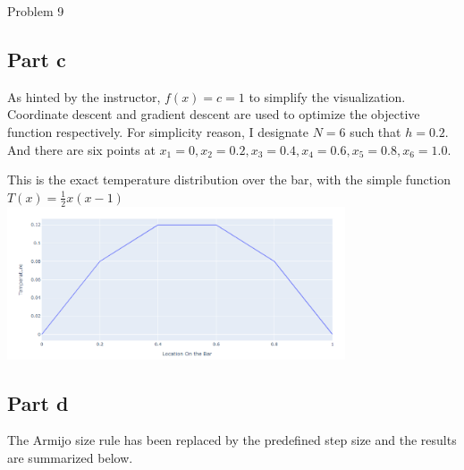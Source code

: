 \documentclass[10pt]{article}
\begin{document}
\begin{section}{Problem 9}
\subsection{Part c}
As hinted by the instructor, $f(x) = c = 1$ to simplify the visualization. Coordinate descent and gradient descent are used to optimize the objective function respectively. For simplicity reason, I designate $N = 6$ such that $h = 0.2$. And there are six points at $x_1 = 0, x_2 = 0.2, x_3 = 0.4, x_4 = 0.6, x_5 = 0.8, x_6 = 1.0$. 

This is the exact temperature distribution over the bar, with the simple function $T(x) = \frac{1}{2}x(x-1)$\\
\includegraphics[width=10cm]{img/problem9_plt1.png}

\subsection{Part d}
The Armijo size rule has been replaced by the predefined step size and the results are summarized below. \\

\end{section}
\end{document}
